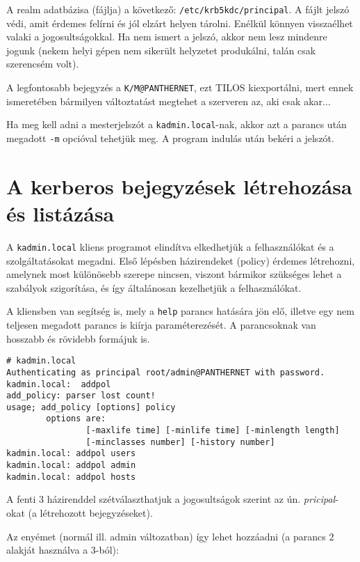 A realm adatbázisa (fájlja) a következő: \texttt{/etc/krb5kdc/principal}. A fájlt jelszó védi, amit érdemes felírni és
jól elzárt helyen tárolni. Enélkül könnyen visszaélhet valaki a jogosultságokkal. Ha nem ismert a jelszó, akkor nem
lesz mindenre jogunk (nekem helyi gépen nem sikerült helyzetet produkálni, talán csak szerencsém volt).

A legfontosabb bejegyzés a \texttt{K/M@PANTHERNET}, ezt TILOS kiexportálni, mert ennek ismeretében bármilyen
változtatást megtehet a szerveren az, aki csak akar...

Ha meg kell adni a mesterjelszót a \texttt{kadmin.local}-nak, akkor azt a parancs után megadott \texttt{-m} opcióval
tehetjük meg. A program indulás után bekéri a jelszót.

\section{A kerberos bejegyzések létrehozása és listázása}
A \texttt{kadmin.local} kliens programot elindítva elkedhetjük a felhasználókat és a szolgáltatásokat megadni. Első lépésben
házirendeket (policy) érdemes létrehozni, amelynek most különösebb szerepe nincsen, viszont bármikor szükséges lehet a
szabályok szigorítása, és így általánosan kezelhetjük a felhasználókat.

A kliensben van segítség is, mely a \texttt{help} parancs hatására jön elő, illetve egy nem teljesen megadott parancs
is kiírja paraméterezését. A parancsoknak van hosszabb és rövidebb formájuk is.

\begin{Verbatim}[frame=single,label=házirendek]
# kadmin.local
Authenticating as principal root/admin@PANTHERNET with password.
kadmin.local:  addpol
add_policy: parser lost count!
usage; add_policy [options] policy
        options are:
                [-maxlife time] [-minlife time] [-minlength length]
                [-minclasses number] [-history number]
kadmin.local: addpol users
kadmin.local: addpol admin
kadmin.local: addpol hosts
\end{Verbatim}

A fenti 3 házirenddel szétválaszthatjuk a jogosultságok szerint az ún. \emph{pricipal}-okat (a létrehozott
bejegyzéseket).

Az enyémet (normál ill. admin változatban) így lehet hozzáadni (a parancs 2 alakját használva a 3-ból):

